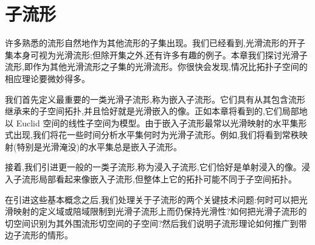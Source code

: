 \documentclass[../main.tex]{subfiles}
\begin{document}
\chapter{子流形}\label{chapter:ch05-子流形}

许多熟悉的流形自然地作为其他流形的子集出现。我们已经看到,光滑流形的开子集本身可视为光滑流形;但除开集之外,还有许多有趣的例子。本章我们探讨光滑子流形,即作为其他光滑流形之子集的光滑流形。你很快会发现,情况比拓扑子空间的相应理论要微妙得多。

我们首先定义最重要的一类光滑子流形,称为嵌入子流形。它们具有从其包含流形继承来的子空间拓扑,并且恰好就是光滑嵌入的像。正如本章将看到的,它们局部地以 Euclid 空间的线性子空间为模型。由于嵌入子流形最常以光滑映射的水平集形式出现,我们将花一些时间分析水平集何时为光滑子流形。例如,我们将看到常秩映射(特别是光滑淹没)的水平集总是嵌入子流形。

接着,我们引进更一般的一类子流形,称为浸入子流形,它们恰好是单射浸入的像。浸入子流形局部看起来像嵌入子流形,但整体上它的拓扑可能不同于子空间拓扑。

在引进这些基本概念之后,我们处理关于子流形的两个关键技术问题:何时可以把光滑映射的定义域或陪域限制到光滑子流形上而仍保持光滑性?如何把光滑子流形的切空间识别为其外围流形切空间的子空间?然后我们说明子流形理论如何推广到带边子流形的情形。







\end{document}
